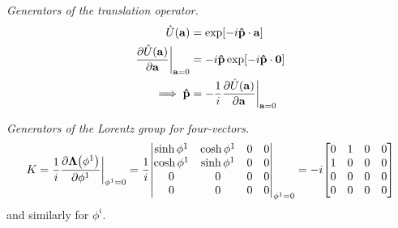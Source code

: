 \documentclass{report}
\begin{document}
\begin{subquests}
	\item \emph	{Generators of the translation operator.}
	\begin{align*}
		\hat{U}\pqty{\vb a} & = \exp[-i{\vb{\hat p} \cdot \vb a}] \\
		\pdv{\hat{U}\pqty{\vb a}}{\vb a}\bigg|_{{\vb a} = 0} & = -i{\vb{\hat p}}\exp[-i{\vb{\hat{p}}\cdot \vb 0}]\\
		\implies \vb{\hat{p}} & = -\frac{1}{i}\pdv{\hat{U}\pqty{\vb a}}{\vb a}\bigg|_{{\vb a} = 0}
	\end{align*}

	\item \emph	{Generators of the Lorentz group for four-vectors.}
	\begin{gather*}
		K = \frac{1}{i}\pdv{{\vb \Lambda}\pqty{\phi^1}}{\phi^1}\bigg|_{{\phi^1} = 0} = \frac{1}{i}\mqty|
			\sinh \phi^1 & \cosh \phi^1 & 0 & 0 \\
			\cosh \phi^1 & \sinh \phi^1 & 0 & 0 \\
			0 & 0 & 0 & 0 \\
			0 & 0 & 0 & 0
		|_{\phi^1 = 0}
		= -i\mqty[
			0 & 1 & 0 & 0 \\
			1 & 0 & 0 & 0 \\
			0 & 0 & 0 & 0 \\
			0 & 0 & 0 & 0
		]
	\end{gather*}
	and similarly for $\phi^i$.


\end{subquests}
\end{document}
